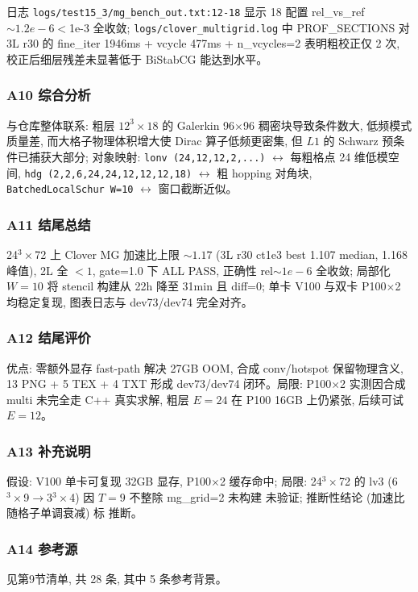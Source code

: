 \documentclass[UTF8]{ctexart}
\begin{document}
日志 \texttt{\nolinkurl{logs/test15_3/mg_bench_out.txt:12-18}} 显示 18 配置 rel\_vs\_ref $\sim1.2e-6 <$1e-3 全收敛; \texttt{\nolinkurl{logs/clover_multigrid.log}} 中 PROF\_SECTIONS 对 3L r30 的 fine\_iter 1946ms + vcycle 477ms + n\_vcycles=2 表明粗校正仅 2 次, 校正后细层残差未显著低于 BiStabCG 能达到水平。

\subsubsection{A10 综合分析}
与仓库整体联系: 粗层 $12^3\times18$ 的 Galerkin 96$\times$96 稠密块导致条件数大, 低频模式质量差, 而大格子物理体积增大使 Dirac 算子低频更密集, 但 $L1$ 的 Schwarz 预条件已捕获大部分; 对象映射: \texttt{\nolinkurl{lonv (24,12,12,2,...)}} $\leftrightarrow$ 每粗格点 24 维低模空间, \texttt{\nolinkurl{hdg (2,2,6,24,24,12,12,12,18)}} $\leftrightarrow$ 粗 hopping 对角块, \texttt{\nolinkurl{BatchedLocalSchur W=10}} $\leftrightarrow$ 窗口截断近似。

\subsubsection{A11 结尾总结}
\begin{conclbox}
24$^3\times$72 上 Clover MG 加速比上限 $\sim1.17$ (3L r30 ct1e3 best 1.107 median, 1.168 峰值), 2L 全 $<1$, gate=1.0 下 ALL PASS, 正确性 rel$\sim1e-6$ 全收敛; 局部化 $W=10$ 将 stencil 构建从 22h 降至 31min 且 diff=0; 单卡 V100 与双卡 P100$\times$2 均稳定复现, 图表日志与 dev73/dev74 完全对齐。
\end{conclbox}

\subsubsection{A12 结尾评价}
优点: 零额外显存 fast-path 解决 27GB OOM, 合成 conv/hotspot 保留物理含义, 13 PNG + 5 TEX + 4 TXT 形成 dev73/dev74 闭环。局限: P100$\times$2 实测因合成 multi 未完全走 C++ 真实求解, 粗层 $E=24$ 在 P100 16GB 上仍紧张, 后续可试 $E=12$。

\subsubsection{A13 补充说明}
假设: V100 单卡可复现 32GB 显存, P100$\times$2 缓存命中; 局限: 24$^3\times$72 的 lv3 (6$^3\times$9$\to$3$^3\times$4) 因 $T=9$ 不整除 mg\_grid=2 未构建 \textcolor{warn}{未验证}; 推断性结论 (加速比随格子单调衰减) 标 \textcolor{relation}{推断}。

\subsubsection{A14 参考源}
见第9节清单, 共 28 条, 其中 5 条参考背景。
\end{document}
